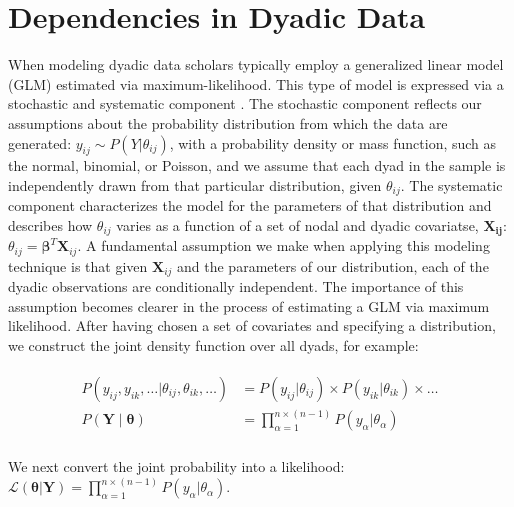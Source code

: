 \section{\textbf{Dependencies in Dyadic Data}}

When modeling dyadic data scholars typically employ a generalized linear model (GLM) estimated via maximum-likelihood. This type of model is expressed via a stochastic and systematic component \citep{pawitan:2013}. The stochastic component reflects our assumptions about the probability distribution from which the data are generated: $y_{ij} \sim P(Y | \theta_{ij})$, with a probability density or mass function, such as the normal, binomial, or Poisson, and we assume that each dyad in the sample is independently drawn from that particular distribution, given $\theta_{ij}$. The systematic component characterizes the model for the parameters of that distribution and describes how $\theta_{ij}$ varies as a function of a set of nodal and dyadic covariatse, $\mathbf{X_{ij}}$: $\theta_{ij} = \bm\beta^{T} \mathbf{X}_{ij}$. A fundamental assumption we make when applying this modeling technique is that given $\mathbf{X}_{ij}$ and the parameters of our distribution, each of the dyadic observations are conditionally independent. The importance of this assumption becomes clearer in the process of estimating a GLM via maximum likelihood. After having chosen a set of covariates and specifying a distribution, we construct the joint density function over all dyads, for example:

\vspace{-8mm}
\begin{align}
\begin{aligned}
	P(y_{ij}, y_{ik}, \ldots | \theta_{ij}, \theta_{ik}, \ldots ) &= P(y_{ij} | \theta_{ij}) \times P(y_{ik} | \theta_{ik}) \times \ldots  \\
	P(\mathbf{Y} \; | \; \bm{\theta}) &= \prod_{\alpha=1}^{n \times (n-1)} P(y_{\alpha} | \theta_{\alpha})  \\
\end{aligned}
\end{align}

\noindent We next convert the joint probability into a likelihood: $\displaystyle \mathcal{L} (\bm{\theta} | \mathbf{Y}) = \prod_{\alpha=1}^{n \times (n-1)} P(y_{\alpha} | \theta_{\alpha})$.

